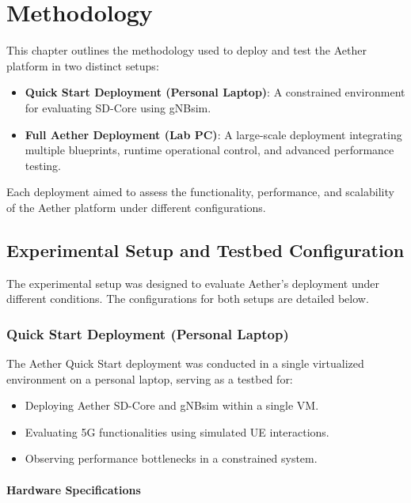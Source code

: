 \chapter{Methodology}
\label{ch:methodology}

This chapter outlines the methodology used to deploy and test the Aether platform in two distinct setups:
\begin{itemize}
    \item \textbf{Quick Start Deployment (Personal Laptop)}: A constrained environment for evaluating SD-Core using gNBsim.
    \item \textbf{Full Aether Deployment (Lab PC)}: A large-scale deployment integrating multiple blueprints, runtime operational control, and advanced performance testing.
\end{itemize}

Each deployment aimed to assess the functionality, performance, and scalability of the Aether platform under different configurations.

\section{Experimental Setup and Testbed Configuration}

The experimental setup was designed to evaluate Aether’s deployment under different conditions. The configurations for both setups are detailed below.

\subsection{Quick Start Deployment (Personal Laptop)}

The Aether Quick Start deployment was conducted in a single virtualized environment on a personal laptop, serving as a testbed for:
\begin{itemize}
    \item Deploying Aether SD-Core and gNBsim within a single VM.
    \item Evaluating 5G functionalities using simulated UE interactions.
    \item Observing performance bottlenecks in a constrained system.
\end{itemize}

\subsubsection{Hardware Specifications}

